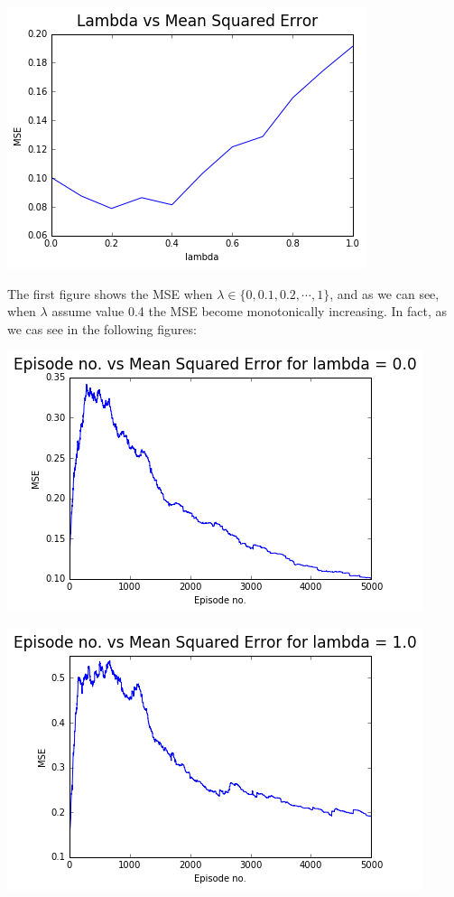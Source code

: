 \documentclass[11pt]{article}
\theoremstyle{plain}
\theoremstyle{definition}
\begin{document}
\begin{center}
\includegraphics[scale=0.7]{10}
\end{center}

The first figure shows the MSE when $\lambda \in \{0, 0.1, 0.2,\cdots,1\}$, and as we can see, when $\lambda$ assume value 0.4 the MSE become monotonically increasing. In fact, as we cas see in the following figures:

\begin{center}
\includegraphics[scale=0.7]{8}
\end{center}
\begin{center}
\includegraphics[scale=0.7]{9}
\end{center}
\end{document}

